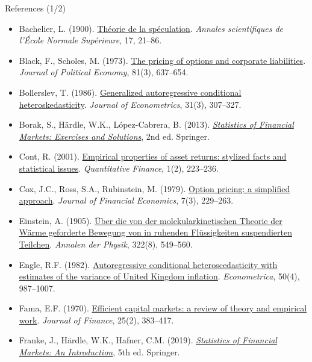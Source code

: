 \begin{frame}{References (1/2)}
\itemsize{\tiny}
\begin{itemize}
    \item Bachelier, L. (1900). \href{https://doi.org/10.24033/asens.476}{Théorie de la spéculation}. \textit{Annales scientifiques de l'École Normale Supérieure}, 17, 21--86.
    \item Black, F., Scholes, M. (1973). \href{https://doi.org/10.1086/260062}{The pricing of options and corporate liabilities}. \textit{Journal of Political Economy}, 81(3), 637--654.
    \item Bollerslev, T. (1986). \href{https://doi.org/10.1016/0304-4076(86)90063-1}{Generalized autoregressive conditional heteroskedasticity}. \textit{Journal of Econometrics}, 31(3), 307--327.
    \item Borak, S., Härdle, W.K., López-Cabrera, B. (2013). \href{https://doi.org/10.1007/978-3-642-33929-5}{\textit{Statistics of Financial Markets: Exercises and Solutions}}, 2nd ed. Springer.
    \item Cont, R. (2001). \href{https://doi.org/10.1080/713665670}{Empirical properties of asset returns: stylized facts and statistical issues}. \textit{Quantitative Finance}, 1(2), 223--236.
    \item Cox, J.C., Ross, S.A., Rubinstein, M. (1979). \href{https://doi.org/10.1016/0304-405X(79)90015-1}{Option pricing: a simplified approach}. \textit{Journal of Financial Economics}, 7(3), 229--263.
    \item Einstein, A. (1905). \href{https://doi.org/10.1002/andp.19053220806}{Über die von der molekularkinetischen Theorie der Wärme geforderte Bewegung von in ruhenden Flüssigkeiten suspendierten Teilchen}. \textit{Annalen der Physik}, 322(8), 549--560.
    \item Engle, R.F. (1982). \href{https://doi.org/10.2307/1912773}{Autoregressive conditional heteroscedasticity with estimates of the variance of United Kingdom inflation}. \textit{Econometrica}, 50(4), 987--1007.
    \item Fama, E.F. (1970). \href{https://doi.org/10.2307/2325486}{Efficient capital markets: a review of theory and empirical work}. \textit{Journal of Finance}, 25(2), 383--417.
    \item Franke, J., Härdle, W.K., Hafner, C.M. (2019). \href{https://doi.org/10.1007/978-3-030-13751-9}{\textit{Statistics of Financial Markets: An Introduction}}, 5th ed. Springer.
\end{itemize}
\end{frame}

